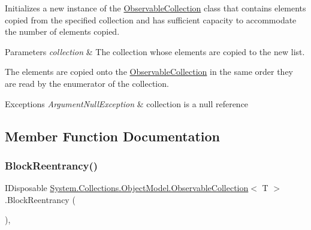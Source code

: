 Initializes a new instance of the \hyperlink{class_system_1_1_collections_1_1_object_model_1_1_observable_collection}{Observable\+Collection} class that contains elements copied from the specified collection and has sufficient capacity to accommodate the number of elements copied. 


\begin{DoxyParams}{Parameters}
{\em collection} & The collection whose elements are copied to the new list.\\
\hline
\end{DoxyParams}


The elements are copied onto the \hyperlink{class_system_1_1_collections_1_1_object_model_1_1_observable_collection}{Observable\+Collection} in the same order they are read by the enumerator of the collection. 


\begin{DoxyExceptions}{Exceptions}
{\em Argument\+Null\+Exception} & collection is a null reference \\
\hline
\end{DoxyExceptions}


\subsection{Member Function Documentation}
\mbox{\label{class_system_1_1_collections_1_1_object_model_1_1_observable_collection_a5e3bd1cc8385d41ef18c5cd7142c33d1}} 
\subsubsection{\texorpdfstring{Block\+Reentrancy()}{BlockReentrancy()}}
{\footnotesize\ttfamily I\+Disposable \hyperlink{class_system_1_1_collections_1_1_object_model_1_1_observable_collection}{System.\+Collections.\+Object\+Model.\+Observable\+Collection}$<$ T $>$.Block\+Reentrancy (\begin{DoxyParamCaption}{ }\end{DoxyParamCaption})\hspace{0.3cm}{\ttfamily [inline]}, {\ttfamily [protected]}}




